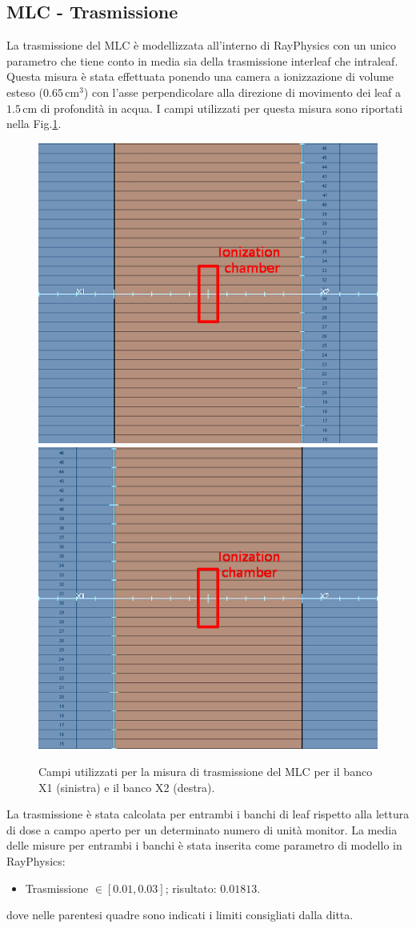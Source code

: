 \subsection{MLC - Trasmissione}
La trasmissione del MLC è modellizzata all'interno di RayPhysics con un unico parametro che tiene conto in media sia della trasmissione interleaf che intraleaf. Questa misura è stata effettuata ponendo una camera a ionizzazione di volume esteso ($0.65\,$cm$^3$) con l'asse perpendicolare alla direzione di movimento dei leaf a $1.5\,$cm di profondità in acqua. I campi utilizzati per questa misura sono riportati nella Fig.\ref{fig:MLC_Trans}. 
\begin{figure}
\centering
\includegraphics[width=.48\textwidth]{./cap2/MLC_TransX1.png}
\includegraphics[width=.48\textwidth]{./cap2/MLC_TransX2.png}
\caption{Campi utilizzati per la misura di trasmissione del MLC per il banco X1 (sinistra) e il banco X2 (destra).}
\label{fig:MLC_Trans}
\end{figure}

La trasmissione è stata calcolata per entrambi i banchi di leaf rispetto alla lettura di dose a campo aperto per un determinato numero di unità monitor. La media delle misure per entrambi i banchi è stata inserita come parametro di modello in RayPhysics:
\begin{itemize}
\item Trasmissione $\in [0.01,0.03]$; risultato: $0.01813$.
\end{itemize}
dove nelle parentesi quadre sono indicati i limiti consigliati dalla ditta.

